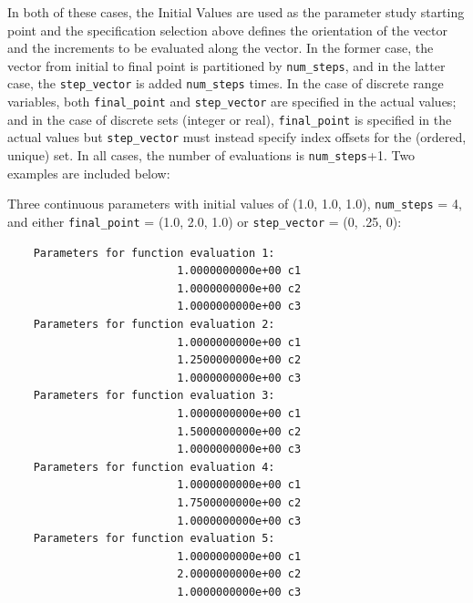 In both of these cases, the Initial Values are used as the parameter
study starting point and the specification selection above defines the
orientation of the vector and the increments to be evaluated along the
vector. In the former case, the vector from initial to final point is
partitioned by \texttt{num\_steps}, and in the latter case, the 
\texttt{step\_vector} is added \texttt{num\_steps} times.  In the case
of discrete range variables, both \texttt{final\_point} and 
\texttt{step\_vector} are specified in the actual values; and in the
case of discrete sets (integer or real), \texttt{final\_point} is
specified in the actual values but \texttt{step\_vector} must instead
specify index offsets for the (ordered, unique) set.  In all cases,
the number of evaluations is \texttt{num\_steps}+1. Two examples are
included below:

Three continuous parameters with initial values of (1.0, 1.0, 1.0), 
\texttt{num\_steps} = 4, and either \texttt{final\_point} = 
(1.0, 2.0, 1.0) or \texttt{step\_vector} = (0, .25, 0):
\begin{small}
\begin{verbatim}
    Parameters for function evaluation 1:
                          1.0000000000e+00 c1   
                          1.0000000000e+00 c2   
                          1.0000000000e+00 c3   
    Parameters for function evaluation 2:
                          1.0000000000e+00 c1   
                          1.2500000000e+00 c2   
                          1.0000000000e+00 c3   
    Parameters for function evaluation 3:
                          1.0000000000e+00 c1   
                          1.5000000000e+00 c2   
                          1.0000000000e+00 c3   
    Parameters for function evaluation 4:
                          1.0000000000e+00 c1   
                          1.7500000000e+00 c2   
                          1.0000000000e+00 c3   
    Parameters for function evaluation 5:
                          1.0000000000e+00 c1   
                          2.0000000000e+00 c2   
                          1.0000000000e+00 c3   
\end{verbatim}
\end{small}


